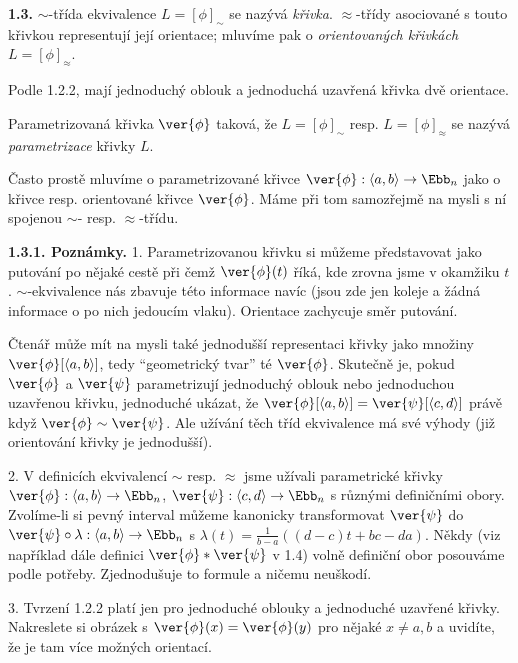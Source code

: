 \documentclass[12pt]{article}
\begin{document}
   \bigskip
 
 {\bf 1.3.}  $\sim$-třída ekvivalence $L=[\phi]_\sim$ se nazývá {\em křivka}.  $\approx$-třídy asociované s touto křivkou representují její orientace; mluvíme pak o  {\em orientovaných křivkách}
 $L=[\phi]_\approx$. 

Podle 1.2.2, mají jednoduchý oblouk a jednoduchá uzavřená křivka  dvě orientace.

Parametrizovaná křivka $\ver{\phi}$ taková, že $L=[\phi]_\sim$ resp. $L=[\phi]_\approx$ se nazývá {\em parametrizace} křivky $L$.
 
Často prostě mluvíme o parametrizované křivce  $\ver{\phi}:\langle a,b\rangle\to\Ebb_n$ jako o křivce resp. orientované křivce $\ver{\phi}$. Máme při tom samozřejmě na mysli s ní spojenou $\sim$-  resp. $\approx$-třídu.
 

 \medskip
 
 {\bf 1.3.1. Poznámky.} 1. Parametrizovanou křivku si můžeme představovat jako putování po nějaké cestě při čemž $\ver{\phi}(t)$ říká, kde zrovna jsme v okamžiku
 $t$.  $\sim$-ekvivalence nás zbavuje této informace navíc (jsou zde jen koleje a žádná informace o po nich jedoucím vlaku). Orientace zachycuje směr putování. 
 
  Čtenář může mít na mysli také jednodušší representaci křivky jako množiny
 $\ver{\phi}[\langle a,b\rangle]$, tedy ``geometrický tvar'' té $\ver{\phi}$. Skutečně je, pokud $\ver{\phi}$ a $\ver{\psi}$ parametrizují jednoduchý oblouk nebo jednoduchou uzavřenou křivku, jednoduché ukázat, že
 $\ver{\phi}[\langle a,b\rangle]=\ver{\psi}[\langle c,d\rangle]$ právě když $\ver{\phi}\sim\ver{\psi}$.
  Ale užívání těch tříd ekvivalence má své výhody  (již orientování křivky je jednodušší).
 
 2. V definicích ekvivalencí $\sim$ resp. $\approx$ jsme užívali parametrické křivky  $\ver{\phi}:\langle a,b\rangle\to\Ebb_n$, 
  $\ver{\psi}:\langle c,d\rangle\to\Ebb_n$ s různými definičními obory. Zvolíme-li si pevný interval můžeme kanonicky transformovat $\ver{\psi}$ do $\ver{\psi}\circ\lambda:\langle a,b\rangle\to\Ebb_n$
  s $\lambda(t)=\frac1{b-a}((d-c)t+bc-da)$. Někdy (viz například dále definici  $\ver{\phi}*\ver{\psi}$ v 1.4) volně definiční obor posouváme podle potřeby. Zjednodušuje to formule a ničemu neuškodí.
 
 3. Tvrzení 1.2.2 platí jen pro jednoduché oblouky a jednoduché uzavřené křivky. Nakreslete si obrázek s $\ver{\phi}(x)=\ver{\phi}(y)$ pro nějaké
 $x\neq a,b$ a uvidíte, že je tam více možných orientací.
 
\end{document}
